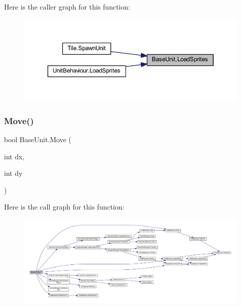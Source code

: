 Here is the caller graph for this function\+:
\nopagebreak
\begin{figure}[H]
\begin{center}
\leavevmode
\includegraphics[width=350pt]{class_base_unit_ab93bf1d3c3ca2899d591a936760d46cf_icgraph}
\end{center}
\end{figure}
\mbox{\label{class_base_unit_af7d5e0c6e087b3e5c8af203dfb11268b}} 
\subsubsection{\texorpdfstring{Move()}{Move()}}
{\footnotesize\ttfamily bool Base\+Unit.\+Move (\begin{DoxyParamCaption}\item[{int}]{dx,  }\item[{int}]{dy }\end{DoxyParamCaption})}

Here is the call graph for this function\+:
\nopagebreak
\begin{figure}[H]
\begin{center}
\leavevmode
\includegraphics[width=350pt]{class_base_unit_af7d5e0c6e087b3e5c8af203dfb11268b_cgraph}
\end{center}
\end{figure}
\mbox{\label{class_base_unit_a8412f2b3e8ec9c3ff75b41b830fde443}} 

